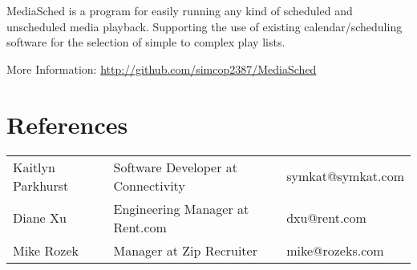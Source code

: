 \documentclass[table,tmargin=1in,bmargin=1in,letterpaper]{resume}
\begin{document}

\begin{compactitem}
\item MediaSched is a program for easily running any kind of scheduled and unscheduled media playback.  Supporting the use of existing calendar/scheduling software for the selection of simple to complex play lists.
\item More Information: \url{http://github.com/simcop2387/MediaSched}
\end{compactitem}

\section{References}
\begin{tabular}{lll}
\rowcolor{white} Kaitlyn Parkhurst & Software Developer at Connectivity & symkat@symkat.com \\
\rowcolor{lightgray} Diane Xu & Engineering Manager at Rent.com & dxu@rent.com \\
\rowcolor{white} Mike Rozek & Manager at Zip Recruiter & mike@rozeks.com
\end{tabular}
\end{document}
